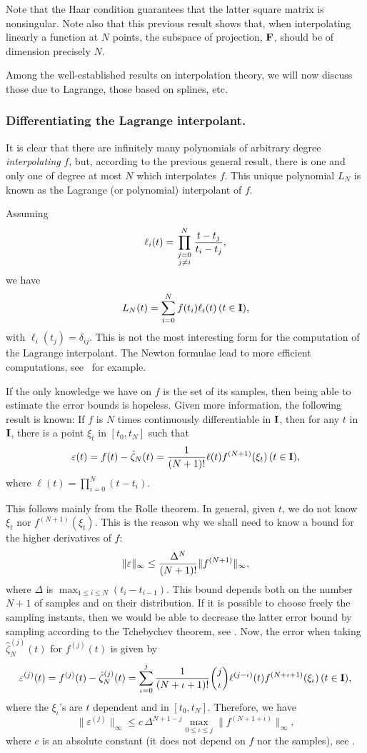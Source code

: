 \noindent
Note that the Haar condition guarantees that the latter square matrix is
nonsingular.
Note also that this previous result shows that, when interpolating linearly a
function at $N$ points, the subspace of projection, ${\bf F}$, should be of
dimension precisely $N$.

Among the well-established results on interpolation theory, we will now discuss
those due to Lagrange, those based on splines, etc.


\subsubsection{Differentiating the Lagrange interpolant.}

It is clear that there are infinitely many polynomials of arbitrary degree
{\it interpolating} $f$, but, according to the previous general result,
there is one and only one of degree at most $N$ which interpolates $f$.
This unique polynomial $L_N$ is known as the Lagrange (or polynomial)
interpolant of $f$.

Assuming
$$
\ell_i(t) = \prod_{\scriptstyle j = 0 \atop \scriptstyle j \ne i}^N{t-t_j \over
t_i - t_j},
$$
we have
$$
L_N(t) = \sum_{i=0}^{N}f(t_i)\ell_i(t) \, (t \in {\bf I}),
$$
with $\ell_i(t_j) = \delta_{ij}$.
This is not the most interesting form for the computation of the Lagrange
interpolant.
The Newton formulae lead to more efficient computations,
see~\cite{stoer1980,marchuk1982,nonweiler1984} for example.

If the only knowledge we have on $f$ is the set of its samples, then being
able to estimate the error bounds is hopeless. Given more information,
the following result is known:
If $f$ is $N$ times continuously differentiable in ${\bf I}$, then for any $t$
in ${\bf I}$, there is a point $\xi_t$ in $\left[ t_0, t_N \right]$ such that
$$
\varepsilon(t) = f(t) - \hat \zeta_{N}(t) = {1 \over
(N+1)!}\ell(t)f^{(N+1)}(\xi_t) \, (t \in {\bf I}),
$$
where $\ell(t) = \prod_{i=0}^N(t-t_i)$.

This follows mainly from the Rolle theorem.
In general, given $t$, we do not know $\xi_t$ nor
$f^{(N+1)}(\xi_t)$.
This is the reason why we shall need to know a bound for the higher
derivatives of $f$:
$$
\| \varepsilon \|_\infty \le {\Delta^N \over (N+1)!}\| f^{(N+1)} \|_\infty,
$$
where $\Delta$ is $\max_{1 \le i \le N}(t_i -t_{i-1})$.
This bound depends both on the number $N+1$ of samples and on their
distribution.
If it is possible to choose freely the sampling instants, then we would be
able to decrease the latter error bound by sampling according to the
Tchebychev theorem, see \cite{nonweiler1984}.
Now, the error when taking $\hat \zeta_{N}^{(j)}(t)$ for $f^{(j)}(t)$ is
given by
$$
\varepsilon^{(j)}(t) = f^{(j)}(t) - \hat \zeta_{N}^{(j)}(t) = \sum_{\iota =
0}^j{1 \over (N+\iota+1)!}{j \choose
\iota}\ell^{(j-\iota)}(t)f^{(N+\iota+1)}(\xi_\iota) \, (t \in {\bf I}),
$$
where the $\xi_\iota$'s are $t$ dependent and in $\left[ t_0, t_N
\right]$.
Therefore, we have
$$
\| \varepsilon^{(j)} \|_\infty \le c \, \Delta^{N+1-j} \max_{0 \le \iota \le
j}\| f^{(N+1+\iota)} \|_\infty,
$$
where $c$ is an absolute constant (it does not depend on $f$ nor
the samples), see \cite{schaback1992}.

